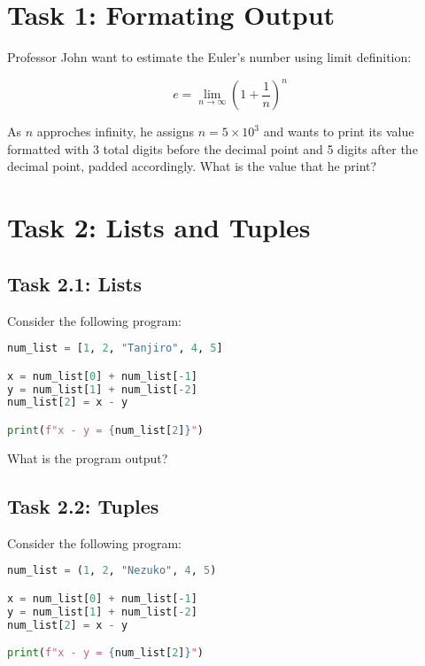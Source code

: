 \documentclass[11pt]{article}
\begin{document}
\section*{Task 1: Formating Output}
Professor John want to estimate the Euler's number using limit definition:

\[ e = \lim_{n \rightarrow \infty} \left(1 + \frac{1}{n} \right) ^ n \]

\noindent
As \(n\) approches infinity, he assigns \(n = 5 \times 10^3\) and wants to print its value formatted with 3 total digits 
before the decimal point and 5 digits after the decimal point, padded accordingly. What is the value that he print?

\begin{tcolorbox}[colback=black!10!white, colframe=black!75!white, title=\textbf{Answer}]
    \vspace{3cm}
\end{tcolorbox}    


\section*{Task 2: Lists and Tuples}
\subsection*{Task 2.1: Lists}
Consider the following program:

\begin{lstlisting}[language=Python]
num_list = [1, 2, "Tanjiro", 4, 5]

x = num_list[0] + num_list[-1]
y = num_list[1] + num_list[-2]
num_list[2] = x - y

print(f"x - y = {num_list[2]}")
\end{lstlisting}

\noindent
What is the program output?
\begin{tcolorbox}[colback=black!10!white, colframe=black!75!white, title=\textbf{Answer}]
    \vspace{3cm}
\end{tcolorbox}    

\clearpage

\subsection*{Task 2.2: Tuples}
Consider the following program:

\begin{lstlisting}[language=Python]
num_list = (1, 2, "Nezuko", 4, 5)

x = num_list[0] + num_list[-1]
y = num_list[1] + num_list[-2]
num_list[2] = x - y

print(f"x - y = {num_list[2]}")
\end{lstlisting}
\end{document}
